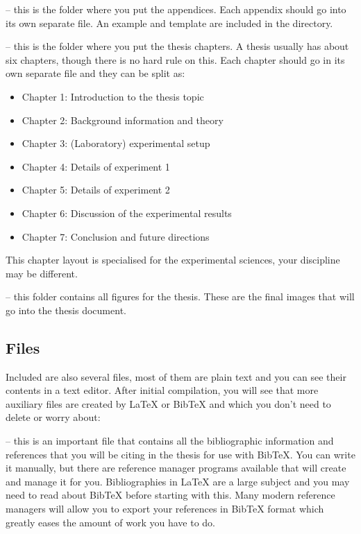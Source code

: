  -- this is the folder where you put the appendices.
Each appendix should go into its own separate  file. An example and template are included in the directory.

 -- this is the folder where you put the thesis chapters.
A thesis usually has about six chapters, though there is no hard rule on this.
Each chapter should go in its own separate  file and they can be split as:
\begin{itemize}
\item Chapter 1: Introduction to the thesis topic
\item Chapter 2: Background information and theory
\item Chapter 3: (Laboratory) experimental setup
\item Chapter 4: Details of experiment 1
\item Chapter 5: Details of experiment 2
\item Chapter 6: Discussion of the experimental results
\item Chapter 7: Conclusion and future directions
\end{itemize}
This chapter layout is specialised for the experimental sciences, your discipline may be different.

 -- this folder contains all figures for the thesis.
These are the final images that will go into the thesis document.

\subsection{Files}

Included are also several files, most of them are plain text and you can see their contents in a text editor.
After initial compilation, you will see that more auxiliary files are created by \LaTeX{} or BibTeX and which you don't need to delete or worry about:

 -- this is an important file that contains all the bibliographic information and references that you will be citing in the thesis for use with BibTeX.
You can write it manually, but there are reference manager programs available that will create and manage it for you.
Bibliographies in \LaTeX{} are a large subject and you may need to read about BibTeX before starting with this.
Many modern reference managers will allow you to export your references in BibTeX format which greatly eases the amount of work you have to do.

